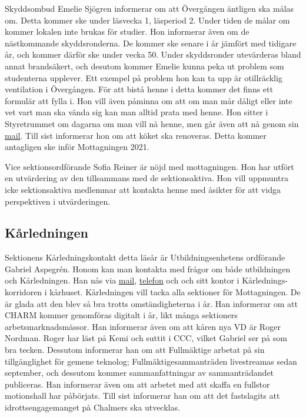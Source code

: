 \documentclass[hidelinks]{sektionsmote}
\begin{document}
Skyddsombud Emelie Sjögren informerar om att Övergången äntligen ska målas om.
Detta kommer ske under läsvecka 1, läsperiod 2.
Under tiden de målar om kommer lokalen inte brukas för studier.
Hon informerar även om de nästkommande skyddsronderna.
De kommer ske senare i år jämfört med tidigare år, och kommer därför ske under vecka 50. Under skyddsronder utevärderas bland annat brandsäkert, och desutom kommer Emelie kunna peka ut problem som studenterna upplever.
Ett exempel på problem hon kan ta upp är otillräcklig ventilation i Övergången.
För att bistå henne i detta kommer det finns ett formulär att fylla i.
Hon vill även påminna om att om man mår dåligt eller inte vet vart man ska vända sig kan man alltid prata med henne.
Hon sitter i Styretrummet om dagarna om man vill nå henne, men går även att nå genom sin \href{mailto:styret.samo@ftek.se}{mail}.
Till sist informerar hon om att köket ska renoveras.
Detta kommer antagligen ske inför Mottagningen 2021.

Vice sektionsordförande Sofia Reiner är nöjd med mottagningen.
Hon har utfört en utvärdering av den tillsammans med de sektionsaktiva.
Hon vill uppmuntra icke sektionsaktiva medlemmar att kontakta henne med åsikter för att vidga perspektiven i utvärderingen.

\subsection{Kårledningen}
Sektionens Kårledningskontakt detta läsår är Utbildningsenhetens ordförande Gabriel Aspegrén.
Honom kan man kontakta med frågor om både utbildningen och Kårledningen.
Han nås via \href{mailto:uo@chalmersstudentkar.se}{mail}, \href{tel:+46317723912}{telefon} och och sitt kontor i Kårlednings-korridoren i kårhuset.
Kårledningen vill tacka alla sektioner för Mottagningen.
De är glada att den blev så bra trotts omständigheterna i år.
Han informerar om att CHARM kommer genomföras digitalt i år, likt många sektioners arbetsmarknadsmässor.
Han informerar även om att kåren nya VD är Roger Nordman.
Roger har läst på Kemi och suttit i CCC, vilket Gabriel ser på som bra tecken.
Dessutom informerar han om att Fullmäktige arbetat på sin tillgänglighet för gemene teknolog; Fullmäktigesammanträden livestreamas sedan september, och dessutom kommer sammanfattningar av sammanträdandet publiceras.
Han informerar även om att arbetet med att skaffa en fullstor motionshall har påbörjats.
Till sist informerar han om att det fastslagits att idrottsengagemanget på Chalmers ska utvecklas.
\end{document}
